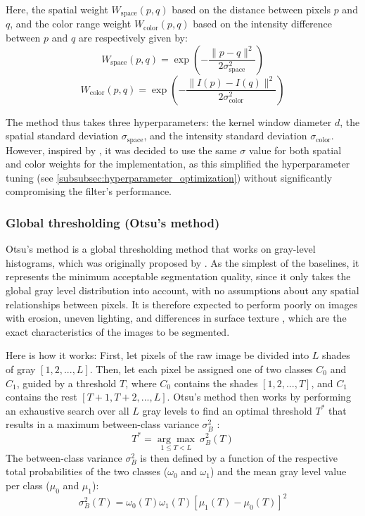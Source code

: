\noindent Here, the spatial weight $W_{\mathrm{space}}(p,q)$ based on the distance between pixels $p$ and $q$, and the color range weight $W_{\mathrm{color}}(p,q)$  based on the intensity difference between $p$ and $q$ are respectively given by:
$$W_{\mathrm{space}}(p,q)=\exp(-\frac{\|p-q\|^2}{2\sigma_{\mathrm{space}}^2})$$
$$W_{\mathrm{color}}(p,q)=\exp(-\frac{\|I(p)-I(q)\|^2}{2\sigma_{\mathrm{color}}^2})$$

\noindent The method thus takes three hyperparameters: the kernel window diameter $d$, the spatial standard deviation $\sigma_{\mathrm{space}}$, and the intensity standard deviation $\sigma_{\mathrm{color}}$.
However, inspired by \parencite{OpenCVBilateralFilter}, it was decided to use the same $\sigma$ value for both spatial and color weights for the implementation, as this simplified the hyperparameter tuning (see \cref{subsubsec:hyperparameter_optimization}) without significantly compromising the filter's performance.

\subsubsection{Global thresholding (Otsu's method)}
\label{subsubsec:otsu_baseline}
Otsu's method is a global thresholding method that works on gray-level histograms, which was originally proposed by \textcite{Otsu1979}.
As the simplest of the baselines, it represents the minimum acceptable segmentation quality, since it only takes the global gray level distribution into account, with no assumptions about any spatial relationships between pixels.
It is therefore expected to perform poorly on images with erosion, uneven lighting, and differences in surface texture \parencite[p.~751]{DigitalImageProcessing}, which are the exact characteristics of the images to be segmented.
\vspace{1em}

Here is how it works:
First, let pixels of the raw image be divided into $L$ shades of gray $[1,2,...,L]$.
Then, let each pixel be assigned one of two classes $C_0$ and $C_1$, guided by a threshold $T$,
 where $C_0$ contains the shades $[1,2,...,T]$, and $C_1$ contains the rest $[T+1,T+2,...,L]$.
Otsu's method then works by performing an exhaustive search over all $L$ gray levels to find an optimal threshold $T^{*}$ that results in a maximum between-class variance $\sigma^2_B$ \parencite{Otsu1979}:
$$ T^{*} = \underset{1 \leq T < L}{\arg \max} ~ \sigma^2_B(T) $$
The between-class variance $\sigma^2_B$ is then defined by a function of the respective total probabilities of the two classes ($\omega_0$ and $\omega_1$) and the mean gray level value per class ($\mu_0$ and $\mu_1$):
 $$ \sigma^2_B(T) = \omega_0(T) \omega_1(T) [\mu_1(T)-\mu_0(T)]^2$$

